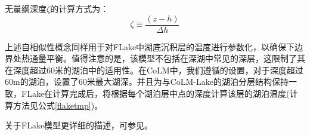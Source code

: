 无量纲深度$\zeta$的计算方式为：
\begin{equation}
    \zeta \equiv \frac{\left( z - h \right)}{\Delta h}
\end{equation}

上述自相似性概念同样用于对FLake中湖底沉积层的温度进行参数化，以确保下边界处热通量平衡。值得注意的是，该模型不包括在深湖中常见的深层，这限制了其在深度超过60米的湖泊中的适用性。在CoLM中，我们遵循\citet{perroud2009simulation}的设置，对于深度超过60\unit{m}的湖泊，设置了60米最大湖深。并且为与CoLM-Lake的湖泊分层结构保持一致，FLake在计算完成后，将根据每个湖泊层中点的深度计算该层的湖泊温度(计算方法见公式\eqref{flaketmp})。

关于FLake模型更详细的描述，可参见\citet{mironovCOSMOTechnicalReport2008a}。